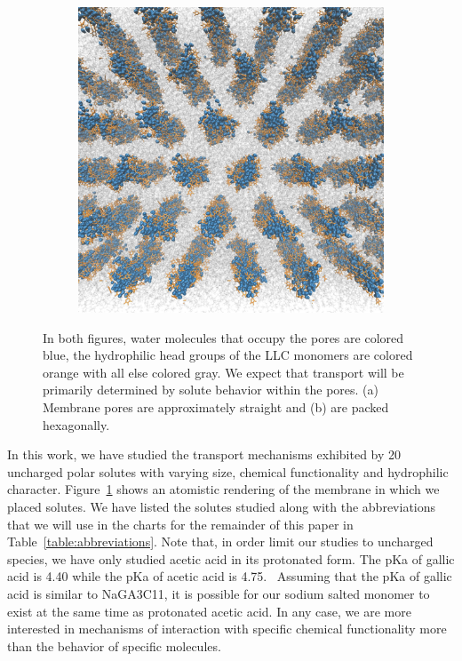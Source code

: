 \documentclass[journal=jpcbfk,manuscript=article]{achemso}
\begin{document}
\begin{figure}
\begin{subfigure}{0.45\textwidth}
  \includegraphics[width=\textwidth]{top_view.pdf}
  \caption{}
  \end{subfigure}
  \caption{In both figures, water molecules that occupy the pores are colored blue,
  the hydrophilic head groups of the LLC monomers are colored orange with all else
  colored gray. We expect that transport will be primarily determined by solute
  behavior within the pores. (a) Membrane pores are approximately straight and (b)
  are packed hexagonally.}\label{fig:membrane_rendering}
  \end{figure}

  In this work, we have studied the transport mechanisms exhibited by 20 
  uncharged polar solutes with varying size, chemical functionality and hydrophilic 
  character. Figure~\ref{fig:membrane_rendering} shows an atomistic rendering of
  the membrane in which we placed solutes. We have listed the solutes studied along with the abbreviations that
  we will use in the charts for the remainder of this paper in Table~\ref{table:abbreviations}.
  Note that, in order limit our studies to uncharged species, we have only studied
  acetic acid in its protonated form. The pKa of gallic acid is 4.40 while the
  pKa of acetic acid is 4.75.~\cite{chuysinuan_gallic_2009,perrin_pka_1981} 
  Assuming that the pKa of gallic acid is similar to NaGA3C11, it is possible
  for our sodium salted monomer to exist at the same time as protonated acetic
  acid. In any case, we are more interested in mechanisms of interaction with
  specific chemical functionality more than the behavior of specific molecules.
\end{document}
